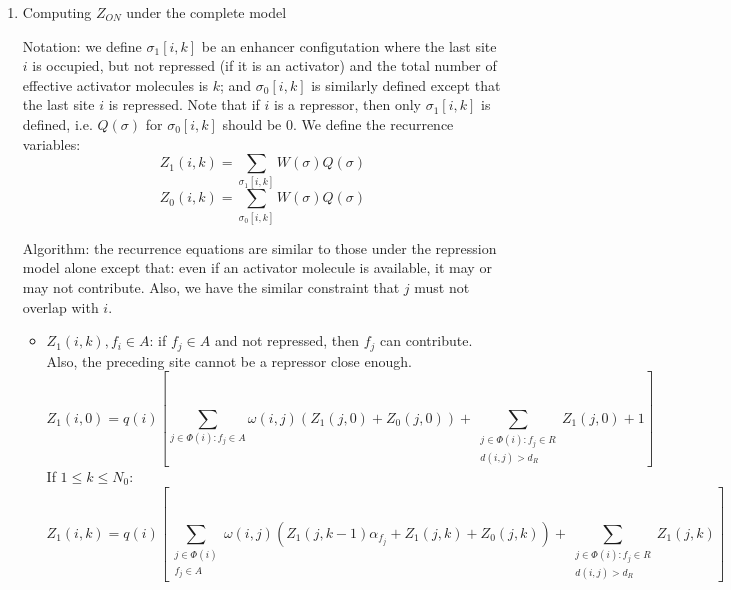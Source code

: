 \documentclass[11pt]{article}
\begin{document}
\begin{enumerate}
\begin{enumerate}
\item{Computing $Z_{ON}$ under the complete model} 

Notation: we define $\sigma_1[i,k]$ be an enhancer configutation where the last site $i$ is occupied, but not repressed (if it is an activator) and the total number of effective activator molecules is $k$; and $\sigma_0[i,k]$ is similarly defined except that the last site $i$ is repressed. Note that if $i$ is a repressor, then only $\sigma_1[i,k]$ is defined, i.e. $Q(\sigma)$ for $\sigma_0[i,k]$ should be 0. We define the recurrence variables: 
\begin{equation}
Z_1(i,k) = \sum_{\sigma_1[i,k]} W(\sigma) Q(\sigma)
\end{equation}
\begin{equation}
Z_0(i,k) = \sum_{\sigma_0[i,k]} W(\sigma) Q(\sigma)
\end{equation}

Algorithm: the recurrence equations are similar to those under the repression model alone except that: even if an activator molecule is available, it may or may not contribute. Also, we have the similar constraint that $j$ must not overlap with $i$. 
\begin{itemize}
\item $Z_1(i,k), f_i \in A$: if $f_j \in A$ and not repressed, then $f_j$ can contribute. Also, the preceding site cannot be a repressor close enough. 
\begin{equation}
Z_1(i,0) = q(i) \left[ \sum_{j \in \Phi (i):f_j \in A} \omega(i,j) \left(Z_1(j,0) + Z_0(j,0)\right) + \sum_{\substack{j \in \Phi (i):f_j \in R\\ d(i,j) > d_R}} Z_1(j,0) + 1\right]
\end{equation}
If $1 \leq k \leq N_0$: 
\begin{equation}
Z_1(i,k)  =  q(i) \left[ \sum_{\substack{j \in \Phi (i)\\f_j \in A}} \omega(i,j) \left(Z_1(j,k-1) \alpha_{f_j}  + Z_1(j,k) + Z_0(j,k)\right) + \sum_{\substack{j \in \Phi (i):f_j \in R\\ d(i,j) > d_R}} Z_1(j,k)\right] 
\end{equation}


\end{itemize}
\end{enumerate}
\end{enumerate}
\end{document}
